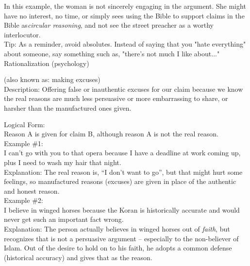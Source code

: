 \documentclass[a4paper,12pt,single,pdftex]{scrartcl}
\begin{document}
    
      In this example, the woman is not sincerely engaging in the argument. She might have no interest, no time, or simply sees using the Bible to support claims in the Bible as{\em  {\it circular reasoning}}, and not see the street preacher as a worthy interlocutor.
    \\

    
      Tip: As a reminder, avoid absolutes. Instead of saying that you "hate everything" about someone, say something such as, "there's not much I like about..."
    \\

  

Rationalization (psychology)
    
      (also known as: making excuses)
    \\

  
    Description: Offering false or inauthentic excuses for our claim because we know the real reasons are much less persuasive or more embarrassing to share, or harsher than the manufactured ones given.

    
      Logical Form:
    \\

    
      Reason A is given for claim B, although reason A is not the real reason.
    \\

    
      Example \#1:
    \\

    
      I can’t go with you to that opera because I have a deadline at work coming up, plus I need to wash my hair that night.
    \\

    
      Explanation: The real reason is, “I don’t want to go”, but that might hurt some feelings, so manufactured reasons (excuses) are given in place of the authentic and honest reason.
    \\

    
      Example \#2:
    \\

    
      I believe in winged horses because the Koran is historically accurate and would never get such an important fact wrong.
    \\

    
      Explanation: The person actually believes in winged horses out of {\it faith}, but recognizes that is not a persuasive argument -- especially to the non-believer of Islam.  Out of the desire to hold on to his faith, he adopts a common defense (historical accuracy) and gives that as the reason.
    \\
\end{document}
